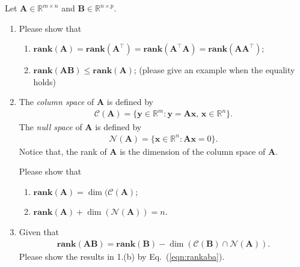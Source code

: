 \documentclass[11pt,letter,notitlepage]{article}
\renewcommand{\eqref}[1]{Eq.~(\ref{#1})}
\newcommand{\rank}[1]{ \textbf{rank}  (#1)  }
\theoremstyle{definition}
\begin{document}
	\newpage
	\begin{exercise}
		Let $\mathbf{A} \in \mathbb{R}^{m\times n}$ and $\mathbf{B}\in \mathbb{R}^{n\times p}$.
		\begin{enumerate}
			\item Please show that
			\begin{enumerate}
				\item $\rank{\mathbf{A}} = \rank{\mathbf{A}^{\top}} = \rank{\mathbf{A}^{\top}\mathbf{A}}= \rank{\mathbf{A}\mathbf{A}^{\top}}$;
				\item $\rank{\mathbf{A}\mathbf{B}} \leq \rank{\mathbf{A}}$; (please give an example when the equality holds)
			\end{enumerate}
			\item The \emph{column space} of $\mathbf{A}$ is defined by
			\begin{align*}
				\mathcal{C}(\mathbf{A} ) = \{ \mathbf{y}\in \mathbb{R}^m : \mathbf{y} = \mathbf{Ax},\,\mathbf{x}\in\mathbb{R}^n\}.
			\end{align*}
			The \emph{null space} of $\mathbf{A}$ is defined by
			\begin{align*}
				\mathcal{N}(\mathbf{A})  = \{ \mathbf{x}\in \mathbb{R}^n : \mathbf{Ax}=0\}.
			\end{align*}
			Notice that, the rank of $\mathbf{A}$ is the dimension of the column space of $\mathbf{A}$.
			
			Please show that
			\begin{enumerate}
				\item $\rank{\mathbf{A}} = \dim(\mathcal{C}(\mathbf{A})$;
				\item $\rank{\mathbf{A}} + \dim ( \mathcal{N}( \mathbf{A} ) ) = n$.
			\end{enumerate}
			\item Given that
			\begin{align}\label{eqn:rankaba}
				\rank{\mathbf{AB}}=\rank{\mathbf{B}}-\dim(\mathcal{C}(\mathbf{B})\cap \mathcal{N}(\mathbf{A})).
			\end{align}
			Please show the results in 1.(b) by \eqref{eqn:rankaba}.
		\end{enumerate}
	\end{exercise}
	
\end{document}
